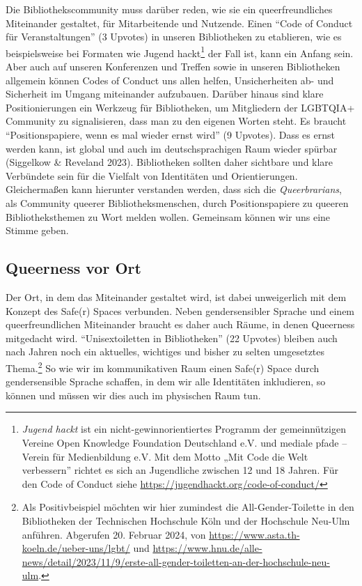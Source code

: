 \documentclass[a4paper,
fontsize=11pt,
oneside,
numbers=noperiodatend,
parskip=half-,
bibliography=totoc,
final
]{scrartcl}
\begin{document}
Die Bibliothekscommunity muss darüber reden, wie sie ein
queerfreundliches Miteinander gestaltet, für Mitarbeitende und Nutzende.
Einen \enquote{Code of Conduct für Veranstaltungen} (3 Upvotes) in
unseren Bibliotheken zu etablieren, wie es beispielsweise bei Formaten
wie Jugend hackt\footnote{\emph{Jugend hackt} ist ein
  nicht-gewinnorientiertes Programm der gemeinnützigen Vereine Open
  Knowledge Foundation Deutschland e.V. und mediale pfade -- Verein für
  Medienbildung e.V. Mit dem Motto „Mit Code die Welt verbessern''
  richtet es sich an Jugendliche zwischen 12 und 18 Jahren. Für den Code
  of Conduct siehe \url{https://jugendhackt.org/code-of-conduct/}} der
Fall ist, kann ein Anfang sein. Aber auch auf unseren Konferenzen und
Treffen sowie in unseren Bibliotheken allgemein können Codes of Conduct
uns allen helfen, Unsicherheiten ab- und Sicherheit im Umgang
miteinander aufzubauen. Darüber hinaus sind klare Positionierungen ein
Werkzeug für Bibliotheken, um Mitgliedern der LGBTQIA+ Community zu
signalisieren, dass man zu den eigenen Worten steht. Es braucht
\enquote{Positionspapiere, wenn es mal wieder ernst wird} (9 Upvotes).
Dass es ernst werden kann, ist global und auch im deutschsprachigen Raum
wieder spürbar (Siggelkow \& Reveland 2023). Bibliotheken sollten daher
sichtbare und klare Verbündete sein für die Vielfalt von Identitäten und
Orientierungen. Gleichermaßen kann hierunter verstanden werden, dass
sich die \emph{Queerbrarians}, als Community queerer
Bibliotheksmenschen, durch Positionspapiere zu queeren Bibliotheksthemen
zu Wort melden wollen. Gemeinsam können wir uns eine Stimme geben.

\subsection{Queerness vor Ort}\label{queerness-vor-ort}

Der Ort, in dem das Miteinander gestaltet wird, ist dabei unweigerlich
mit dem Konzept des Safe(r) Spaces verbunden. Neben gendersensibler
Sprache und einem queerfreundlichen Miteinander braucht es daher auch
Räume, in denen Queerness mitgedacht wird. \enquote{Unisextoiletten in
Bibliotheken} (22 Upvotes) bleiben auch nach Jahren noch ein aktuelles,
wichtiges und bisher zu selten umgesetztes Thema.\footnote{Als
  Positivbeispiel möchten wir hier zumindest die All-Gender-Toilette in
  den Bibliotheken der Technischen Hochschule Köln und der Hochschule
  Neu-Ulm anführen. Abgerufen 20. Februar 2024, von
  \url{https://www.asta.th-koeln.de/ueber-uns/lgbt/} und
  \url{https://www.hnu.de/alle-news/detail/2023/11/9/erste-all-gender-toiletten-an-der-hochschule-neu-ulm}.}
So wie wir im kommunikativen Raum einen Safe(r) Space durch
gendersensible Sprache schaffen, in dem wir alle Identitäten
inkludieren, so können und müssen wir dies auch im physischen Raum tun.
\end{document}

